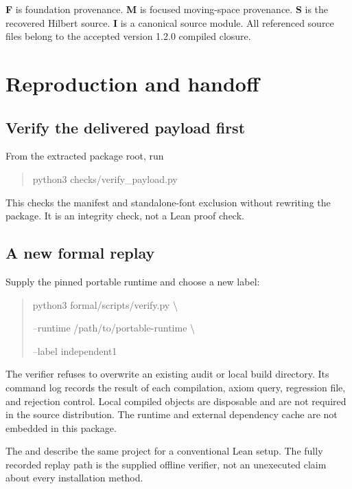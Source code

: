 \documentclass[11pt]{article}
\begin{document}
\textbf{F} is foundation provenance. \textbf{M} is focused moving-space provenance. \textbf{S} is the recovered Hilbert source. \textbf{I} is a canonical source module. All referenced source files belong to the accepted version 1.2.0 compiled closure.


\clearpage\section{Reproduction and handoff}
\subsection{Verify the delivered payload first}
From the extracted package root, run
\begin{quote}\small\ttfamily
python3 checks/verify\_payload.py
\end{quote}
This checks the manifest and standalone-font exclusion without rewriting the package. It is an integrity check, not a Lean proof check.

\subsection{A new formal replay}
Supply the pinned portable runtime and choose a new label:
\begin{quote}\small\ttfamily
python3 formal/scripts/verify.py \textbackslash\par
\hspace*{1em}--runtime /path/to/portable-runtime \textbackslash\par
\hspace*{1em}--label independent1
\end{quote}
The verifier refuses to overwrite an existing audit or local build directory. Its command log records the result of each compilation, axiom query, regression file, and rejection control. Local compiled objects are disposable and are not required in the source distribution. The runtime and external dependency cache are not embedded in this package.

The  and  describe the same project for a conventional Lean setup. The fully recorded replay path is the supplied offline verifier, not an unexecuted claim about every installation method.
\end{document}
